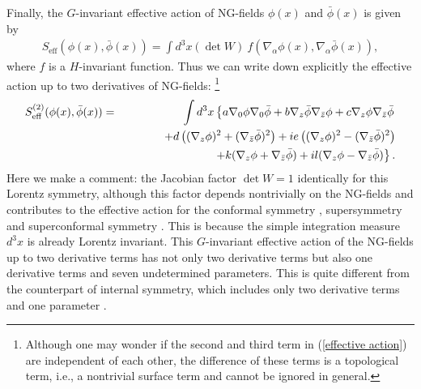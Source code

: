 \documentclass[a4paper,12pt]{article}
\begin{document}
Finally, the $G$-invariant effective action of NG-fields $\phi(x)$ and
$\bar{\phi}(x)$ is given by
\begin{eqnarray}
S_{\textrm{eff}}(\phi(x), \bar{\phi}(x)) = \int d^{3}x (\det W)~
f \left( \nabla_{\alpha} \phi(x), \nabla_{\alpha} \bar{\phi}(x) \right),
\end{eqnarray}
where $f$ is a $H$-invariant function. Thus we can write down explicitly 
the effective action up to two derivatives of NG-fields:
\footnote{
Although one may wonder if the second and third term in (\ref{effective
action}) are independent of each other, the difference of these terms is
a topological term, i.e., a nontrivial surface term and 
cannot be ignored in general.   
} 
\begin{eqnarray}
S_{\textrm{eff}}^{(2)}(\phi(x), \bar{\phi}(x)) 
&=& \int d^{3}x \left\{ a \nabla_{0}\phi \nabla_{0}\bar{\phi} + b \nabla_{z}
\bar{\phi} \nabla_{\bar{z}} \phi + c \nabla_{z} \phi \nabla_{\bar{z}}
\bar{\phi} \right.\nonumber \\ 
&& \hspace*{1.2cm} + d \left( (\nabla_{z} \phi)^{2} 
+ (\nabla_{\bar{z}}
\bar{\phi})^{2} \right) + i e \left((\nabla_{z} \phi)^{2} - 
(\nabla_{\bar{z}} \bar{\phi})^{2} \right) \nonumber \\
&& \hspace*{1.2cm} \left. + k (\nabla_{z} \phi +
\nabla_{\bar{z}} \bar{\phi} ) + i l (\nabla_{z} \phi-\nabla_{\bar{z}}
\bar{\phi}) \right\}. \label{effective action}
\end{eqnarray}
Here we make a comment: the Jacobian factor $\det W = 1$ identically
for this Lorentz symmetry, although this factor depends 
nontrivially on the NG-fields and 
contributes to the effective action for the 
conformal symmetry \cite{Salam-Strathdee2}, supersymmetry
\cite{Volkov-Akulov} and superconformal symmetry \cite{Uematsu}.  
This is because the
simple integration measure $d^3 x$ is already Lorentz invariant.
This $G$-invariant effective action of the NG-fields up to two
derivative terms has not only two derivative terms but 
also one derivative terms and seven undetermined parameters. 
This is quite different from 
the counterpart of internal symmetry, which includes only two
derivative terms and one parameter \cite{Weinberg}. 
\end{document}
